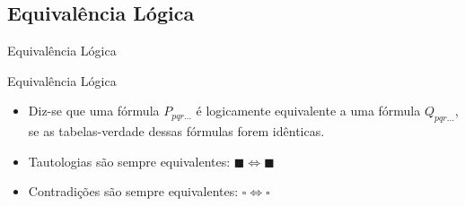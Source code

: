 
\subsection{Equivalência Lógica}

\begin{frame}[t]
\vskip 3.5cm
\begin{center}
{\Huge Equivalência Lógica}
\end{center}
\end{frame}

\begin{frame}[t]{Equivalência Lógica} %
	\begin{itemize}
	\item Diz-se que uma fórmula $P_{pqr\ldots}$ é logicamente equivalente a uma fórmula $Q_{pqr\ldots}$, se as tabelas-verdade dessas fórmulas forem idênticas.

	\item Tautologias são sempre equivalentes: $\blacksquare \Leftrightarrow \blacksquare$

	\item Contradições são sempre equivalentes: $\square \Leftrightarrow \square$

	\end{itemize}
\end{frame}




